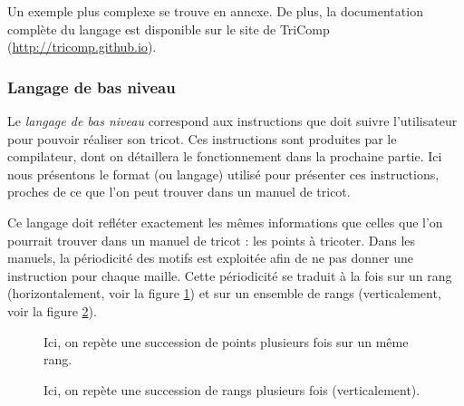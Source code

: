 \documentclass{article}
\begin{document}
Un exemple plus complexe se trouve en annexe. De plus, la documentation complète du langage
est disponible sur le site de TriComp (\url{http://tricomp.github.io}).


\subsubsection{Langage de bas niveau}

Le \emph{langage de bas niveau} correspond aux instructions que doit suivre l'utilisateur 
pour pouvoir réaliser son tricot. Ces instructions sont produites par le compilateur, 
dont on détaillera le fonctionnement dans la prochaine partie. Ici nous présentons le 
format (ou langage) utilisé pour présenter ces instructions, proches de ce que l'on peut 
trouver dans un manuel de tricot.

Ce langage doit refléter exactement les mêmes informations que celles que l'on pourrait 
trouver dans un manuel de tricot : les points à tricoter. Dans les manuels, la périodicité 
des motifs est exploitée afin de ne pas donner une instruction pour chaque maille. Cette 
périodicité se traduit à la fois sur un rang (horizontalement, voir la figure \ref{instruction1}) 
et sur un ensemble de rangs (verticalement, voir la figure \ref{instruction2}).  

\begin{figure}[!ht]
	\centering
	\caption{Ici, on repète une succession de points plusieurs fois sur un même rang.}
	\label{instruction1}
\end{figure}

\begin{figure}[!ht]
	\centering
	\caption{Ici, on repète une succession de rangs plusieurs fois (verticalement).}
	\label{instruction2}
\end{figure}
\end{document}

